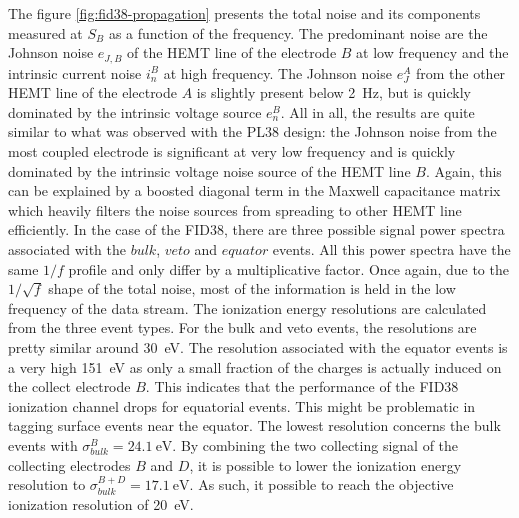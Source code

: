 The figure \ref{fig:fid38-propagation} presents the total noise and its components measured at $S_B$ as a function of the frequency. The predominant noise are the Johnson noise $e_{J,B}$ of the HEMT line of the electrode $B$ at low frequency and the intrinsic current noise $i_n^B$ at high frequency. The Johnson noise $e_J^A$ from the other HEMT line of the electrode $A$ is slightly present below \SI{2}{\Hz}, but is quickly dominated by the intrinsic voltage source $e_n^B$. All in all, the results are quite similar to what was observed with the PL38 design: the Johnson noise from the most coupled electrode is significant at very low frequency and is quickly dominated by the intrinsic voltage noise source of the HEMT line $B$. Again, this can be explained by a boosted diagonal term in the Maxwell capacitance matrix which heavily filters the noise sources from spreading to other HEMT line efficiently.
In the case of the FID38, there are three possible signal power spectra associated with the $bulk$, $veto$ and $equator$ events. All this power spectra have the same $1/f$ profile and only differ by a multiplicative factor.
Once again, due to the $1/\sqrt{f}$ shape of the total noise, most of the information is held in the low frequency of the data stream. The ionization energy resolutions are calculated from the three event types. For the bulk and veto events, the resolutions are pretty similar around \SI{30}{\eV}. The resolution associated with the equator events is a very high \SI{151}{\eV} as only a small fraction of the charges is actually induced on the collect electrode $B$. This indicates that the performance of the FID38 ionization channel drops for equatorial events. This might be problematic in tagging surface events near the equator. The lowest resolution concerns the bulk events with $\sigma_{bulk}^B = \SI{24.1}{\eV}$. By combining the two collecting signal of the collecting electrodes $B$ and $D$, it is possible to lower the ionization energy resolution to  $\sigma_{bulk}^{B+D} = \SI{17.1}{\eV}$. As such, it possible to reach the objective ionization resolution of \SI{20}{\eV}.

